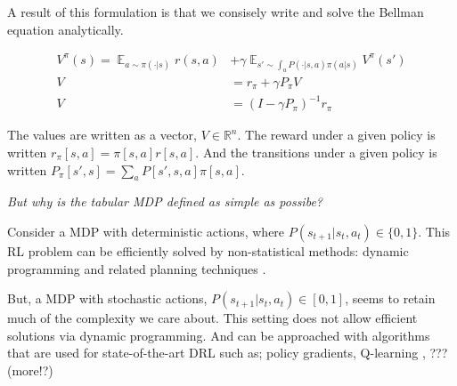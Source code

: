 A result of this formulation is that we consisely write and solve the Bellman equation analytically.

\begin{align}
V^{\pi}(s) = \mathop{\mathbb E}_{a\sim \pi(\cdot | s)} r(s, a) &+ \gamma\mathop{\mathbb E}_{s' \sim \int_a P(\cdot | s, a)\pi(a | s)} V^{\pi}(s') \tag{the bellman eqn}\\
V &= r_{\pi} + \gamma P_{\pi} V \tag{the tabular bellman eqn}\\
V &= (I-\gamma P_{\pi})^{-1}r_{\pi} \tag{analytic solution}
\end{align}

The values are written as a vector, $V \in \mathbb R^n$.
The reward under a given policy is written $r_{\pi}[s, a] = \pi[s, a] r[s, a]$.
And the transitions under a given policy is written $P_{\pi}[s', s] = \sum_a P[s', s, a]\pi[s, a]$.

\begin{displayquote}
\textit{But why is the tabular MDP defined as simple as possibe?}
\end{displayquote}

Consider a MDP with deterministic actions, where $P(s_{t+1}|s_t, a_t) \in \{ 0, 1\}$.
This RL problem can be efficiently solved by non-statistical
methods: dynamic programming and related planning techniques \cite{Bertsekas1995}.

But, a MDP with stochastic actions, $P(s_{t+1}|s_t, a_t) \in [0, 1]$,
seems to retain much of the complexity we care about. This setting does not allow
efficient solutions via dynamic programming. And can be approached with algorithms
that are used for state-of-the-art DRL such as;
policy gradients\cite{Schulman2015a}, Q-learning \cite{Mnih2015}, ??? (more!?)

